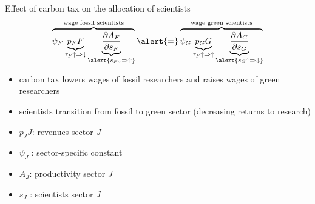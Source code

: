 \documentclass[11pt,aspectratio=169]{beamer}
\begin{document}
\addtocounter{framenumber}{-1}

\begin{frame}{Effect of carbon tax on the allocation of scientists}
	\vspace{0mm}
	 \large
	\begin{align*}
		\overbrace{{\psi_F} \underbrace{p_F{F}}_{\tau_F\uparrow\Rightarrow\downarrow}\underbrace{\frac{\partial A_{F}}{\partial s_{F}}}_{\alert{{s_F\downarrow\Rightarrow\uparrow}}}}^{\text{wage fossil scientists}}\alert{\pmb{=}}\overbrace{{\psi_G} \underbrace{p_G{G}}_{\tau_F\uparrow\Rightarrow\uparrow}\underbrace{\frac{\partial A_{G}}{\partial s_{G}}}_{\alert{{s_G\uparrow\Rightarrow\downarrow}}}}^{\text{wage green scientists}}
	\end{align*}
	\normalsize
	\begin{itemize}
		\item carbon tax lowers wages of fossil researchers and raises wages of green researchers
		\vspace{2mm}
		\item scientists transition from fossil to green sector \small{(decreasing returns to research)}
	\end{itemize}
	\small
	\vspace{4mm}
	\hspace{-2mm}
	\begin{minipage}[t!]{0.4\textwidth}
		\vspace{0mm}
		\begin{itemize}
			\item[] $p_JJ$: revenues sector $J$
			\vspace{-2mm}
			\item[] $\psi_J$ : sector-specific constant
		\end{itemize}
	\end{minipage}
	\vspace{-5mm}
	\begin{minipage}[t!]{0.5\textwidth}
		\vspace{0mm}
		\begin{itemize}	
			\item[] $A_J$: productivity sector $J$
			\vspace{-2mm}			
			\item[] $s_J$ : scientists sector $J$
		\end{itemize}
	\end{minipage}
\end{frame}
\end{document}
